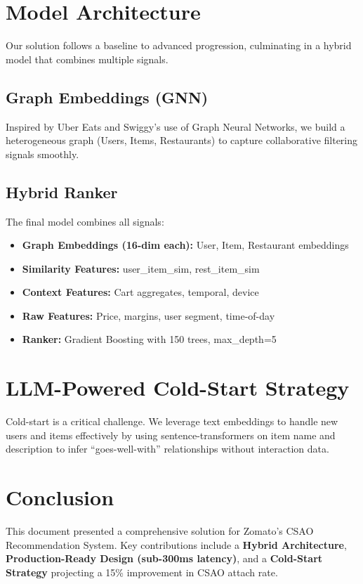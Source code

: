 \documentclass[12pt,a4paper]{article}
\begin{document}
\section{Model Architecture}
Our solution follows a baseline to advanced progression, culminating in a hybrid model that combines multiple signals.

\subsection{Graph Embeddings (GNN)}
Inspired by Uber Eats and Swiggy's use of Graph Neural Networks, we build a heterogeneous graph (Users, Items, Restaurants) to capture collaborative filtering signals smoothly.

\subsection{Hybrid Ranker}
The final model combines all signals:
\begin{itemize}
    \item \textbf{Graph Embeddings (16-dim each):} User, Item, Restaurant embeddings
    \item \textbf{Similarity Features:} user\_item\_sim, rest\_item\_sim
    \item \textbf{Context Features:} Cart aggregates, temporal, device
    \item \textbf{Raw Features:} Price, margins, user segment, time-of-day
    \item \textbf{Ranker:} Gradient Boosting with 150 trees, max\_depth=5
\end{itemize}

\section{LLM-Powered Cold-Start Strategy}
Cold-start is a critical challenge. We leverage text embeddings to handle new users and items effectively by using sentence-transformers on item name and description to infer ``goes-well-with'' relationships without interaction data.

\section{Conclusion}
This document presented a comprehensive solution for Zomato's CSAO Recommendation System. Key contributions include a \textbf{Hybrid Architecture}, \textbf{Production-Ready Design (sub-300ms latency)}, and a \textbf{Cold-Start Strategy} projecting a 15\% improvement in CSAO attach rate.
\end{document}

